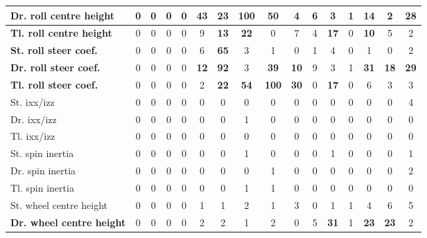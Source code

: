 \begin{table}[H]
\begin{tabular}{|l|c|c|c|c|c|c|c|c|c|c|c|c|c|c|c|}
    \hline
    \textcolor[rgb]{0.851, 0.373, 0.008}{\textbf{Dr. roll centre height}} & 0 & 0 & 0 & 0 & \textcolor[rgb]{0.000, 0.620, 0.451}{\textbf{43}} & \textbf{23} & \textcolor[rgb]{0.835, 0.369, 0.000}{\textbf{100}} & \textcolor[rgb]{0.000, 0.447, 0.698}{\textbf{50}} & 4 & 6 & 3 & 1 & \textbf{14} & 2 & \textcolor[rgb]{0.000, 0.620, 0.451}{\textbf{28}} \\
    \hline
    \textbf{Tl. roll centre height} & 0 & 0 & 0 & 0 & 9 & \textbf{13} & \textbf{22} & 0 & 7 & 4 & \textbf{17} & 0 & \textbf{10} & 5 & 2 \\
    \hline
    \textcolor[rgb]{0.000, 0.447, 0.698}{\textbf{St. roll steer coef.}} & 0 & 0 & 0 & 0 & 6 & \textcolor[rgb]{0.000, 0.447, 0.698}{\textbf{65}} & 3 & 1 & 0 & 1 & 4 & 0 & 1 & 0 & 2 \\
    \hline
    \textcolor[rgb]{0.000, 0.447, 0.698}{\textbf{Dr. roll steer coef.}} & 0 & 0 & 0 & 0 & \textbf{12} & \textcolor[rgb]{0.000, 0.447, 0.698}{\textbf{92}} & 3 & \textcolor[rgb]{0.000, 0.620, 0.451}{\textbf{39}} & \textbf{10} & 9 & 3 & 1 & \textcolor[rgb]{0.000, 0.620, 0.451}{\textbf{31}} & \textbf{18} & \textcolor[rgb]{0.000, 0.620, 0.451}{\textbf{29}} \\
    \hline
    \textcolor[rgb]{0.851, 0.373, 0.008}{\textbf{Tl. roll steer coef.}} & 0 & 0 & 0 & 0 & 2 & \textbf{22} & \textcolor[rgb]{0.000, 0.447, 0.698}{\textbf{54}} & \textcolor[rgb]{0.835, 0.369, 0.000}{\textbf{100}} & \textcolor[rgb]{0.000, 0.620, 0.451}{\textbf{30}} & 0 & \textbf{17} & 0 & 6 & 3 & 3 \\
    \hline
    St. \gls{ixx}/\gls{izz} & 0 & 0 & 0 & 0 & 0 & 0 & 0 & 0 & 0 & 0 & 0 & 0 & 0 & 0 & 4 \\
    \hline
    Dr. \gls{ixx}/\gls{izz} & 0 & 0 & 0 & 0 & 0 & 0 & 1 & 0 & 0 & 0 & 0 & 0 & 0 & 0 & 0 \\
    \hline
    Tl. \gls{ixx}/\gls{izz} & 0 & 0 & 0 & 0 & 0 & 0 & 0 & 0 & 0 & 0 & 0 & 0 & 0 & 0 & 0 \\
    \hline
    St. spin inertia & 0 & 0 & 0 & 0 & 0 & 0 & 1 & 0 & 0 & 0 & 1 & 0 & 0 & 0 & 1 \\
    \hline
    Dr. spin inertia & 0 & 0 & 0 & 0 & 0 & 0 & 0 & 1 & 0 & 0 & 0 & 0 & 0 & 0 & 2 \\
    \hline
    Tl. spin inertia & 0 & 0 & 0 & 0 & 0 & 0 & 1 & 1 & 0 & 0 & 0 & 0 & 0 & 0 & 0 \\
    \hline
    St. wheel centre height & 0 & 0 & 0 & 0 & 1 & 1 & 2 & 1 & 3 & 0 & 1 & 1 & 4 & 6 & 5 \\
    \hline
    \textcolor[rgb]{0.000, 0.620, 0.451}{\textbf{Dr. wheel centre height}} & 0 & 0 & 0 & 0 & 2 & 2 & 1 & 2 & 0 & 5 & \textcolor[rgb]{0.000, 0.620, 0.451}{\textbf{31}} & 1 & \textbf{23} & \textbf{23} & 2 \\

\end{tabular}
\end{table}
